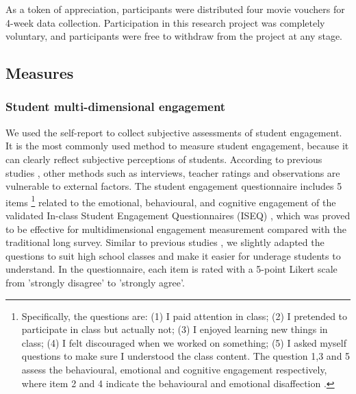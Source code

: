 \documentclass[sigconf]{acmart}
\begin{document}
As a token of appreciation, participants were distributed four movie vouchers for 4-week data collection. Participation in this research project was completely voluntary, and participants were free to withdraw from the project at any stage.
\subsection{Measures}

\subsubsection{Student multi-dimensional engagement} We used the self-report to collect subjective assessments of student engagement. It is the most commonly used method to measure student engagement, because it can clearly reflect subjective perceptions of students. According to previous studies \cite{fredricks2004school,fredricks2012measurement}, other methods such as interviews, teacher ratings and observations are vulnerable to external factors. The student engagement questionnaire includes 5 items \footnote{Specifically, the questions are: (1) I paid attention in class; (2) I pretended to participate in class but actually not; (3) I enjoyed learning new things in class; (4) I felt discouraged when we worked on something; (5) I asked myself questions to make sure I understood the class content. The question 1,3 and 5 assess the behavioural, emotional and cognitive engagement respectively, where item 2 and 4 indicate the
behavioural and emotional disaffection   \cite{fuller2018development,skinner2009motivational}.} related to the emotional, behavioural, and cognitive engagement of the validated In-class Student Engagement Questionnaires (ISEQ) \cite{fuller2018development}, which was proved to be effective for multidimensional engagement measurement compared with the traditional long survey. Similar to previous studies \cite{huynh2018engagemon,gashi2019using}, we slightly adapted the questions to suit high school classes and make it easier for underage students to understand. 
In the questionnaire, each item is rated with a 5-point Likert scale from ’strongly disagree’ to ’strongly agree’.
\end{document}
